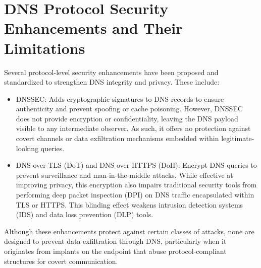 \documentclass [11pt, proquest] {uwthesis}[2020/02/24]
\begin{document}
\section{DNS Protocol Security Enhancements and Their Limitations}
Several protocol-level security enhancements have been proposed and standardized to strengthen DNS integrity and privacy. These include:
\begin{itemize}
    \item DNSSEC: Adds cryptographic signatures to DNS records to ensure authenticity and prevent spoofing or cache poisoning. However, DNSSEC does not provide encryption or confidentiality, leaving the DNS payload visible to any intermediate observer. As such, it offers no protection against covert channels or data exfiltration mechanisms embedded within legitimate-looking queries.
    \item DNS-over-TLS (DoT) and DNS-over-HTTPS (DoH): Encrypt DNS queries to prevent surveillance and man-in-the-middle attacks. While effective at improving privacy, this encryption also impairs traditional security tools from performing deep packet inspection (DPI) on DNS traffic encapsulated within TLS or HTTPS. This blinding effect weakens intrusion detection systems (IDS) and data loss prevention (DLP) tools.
\end{itemize}
Although these enhancements protect against certain classes of attacks, none are designed to prevent data exfiltration through DNS, particularly when it originates from implants on the endpoint that abuse protocol-compliant structures for covert communication.
\end{document}

